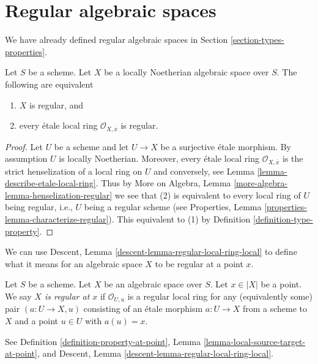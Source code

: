 \section{Regular algebraic spaces}
\label{section-regular}

\noindent
We have already defined regular algebraic spaces in
Section \ref{section-types-properties}.

\begin{lemma}
\label{lemma-regular}
Let $S$ be a scheme.
Let $X$ be a locally Noetherian algebraic space over $S$.
The following are equivalent
\begin{enumerate}
\item $X$ is regular, and
\item every \'etale local ring $\mathcal{O}_{X, \overline{x}}$ is
regular.
\end{enumerate}
\end{lemma}

\begin{proof}
Let $U$ be a scheme and let $U \to X$ be a surjective \'etale morphism.
By assumption $U$ is locally Noetherian. Moreover, every \'etale local
ring $\mathcal{O}_{X, \overline{x}}$ is the strict henselization of
a local ring on $U$ and conversely, see
Lemma \ref{lemma-describe-etale-local-ring}.
Thus by
More on Algebra, Lemma \ref{more-algebra-lemma-henselization-regular}
we see that (2) is equivalent to every local ring of $U$ being
regular, i.e., $U$ being a regular scheme (see
Properties, Lemma \ref{properties-lemma-characterize-regular}).
This equivalent to (1) by
Definition \ref{definition-type-property}.
\end{proof}

\noindent
We can use Descent, Lemma \ref{descent-lemma-regular-local-ring-local}
to define what it means for an algebraic space $X$ to be regular at a
point $x$.

\begin{definition}
\label{definition-regular-at-point}
Let $S$ be a scheme. Let $X$ be an algebraic space over $S$.
Let $x \in |X|$ be a point. We say {\it $X$ is regular at $x$}
if $\mathcal{O}_{U, u}$ is a regular local ring for any
(equivalently some) pair $(a : U \to X, u)$ consisting of an
\'etale morphism $a : U \to X$ from a scheme to $X$ and a point
$u \in U$ with $a(u) = x$.
\end{definition}

\noindent
See Definition \ref{definition-property-at-point},
Lemma \ref{lemma-local-source-target-at-point}, and
Descent, Lemma \ref{descent-lemma-regular-local-ring-local}.

